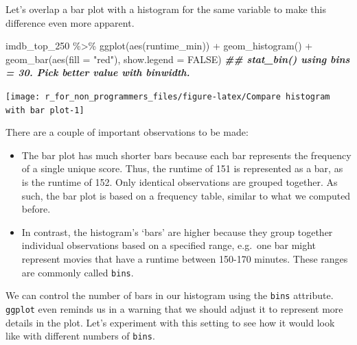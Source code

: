 \documentclass[
]{book}
\newenvironment{Shaded}{\begin{snugshade}}{\end{snugshade}}
\newcommand{\AttributeTok}[1]{\textcolor[rgb]{0.77,0.63,0.00}{#1}}
\newcommand{\ConstantTok}[1]{\textcolor[rgb]{0.00,0.00,0.00}{#1}}
\newcommand{\DocumentationTok}[1]{\textcolor[rgb]{0.56,0.35,0.01}{\textbf{\textit{#1}}}}
\newcommand{\FunctionTok}[1]{\textcolor[rgb]{0.00,0.00,0.00}{#1}}
\newcommand{\NormalTok}[1]{#1}
\newcommand{\SpecialCharTok}[1]{\textcolor[rgb]{0.00,0.00,0.00}{#1}}
\newcommand{\StringTok}[1]{\textcolor[rgb]{0.31,0.60,0.02}{#1}}
\begin{document}
Let's overlap a bar plot with a histogram for the same variable to make this difference even more apparent.

\begin{Shaded}
\begin{Highlighting}[]
\NormalTok{imdb\_top\_250 }\SpecialCharTok{\%\textgreater{}\%}
  \FunctionTok{ggplot}\NormalTok{(}\FunctionTok{aes}\NormalTok{(runtime\_min)) }\SpecialCharTok{+}
  \FunctionTok{geom\_histogram}\NormalTok{() }\SpecialCharTok{+}
  \FunctionTok{geom\_bar}\NormalTok{(}\FunctionTok{aes}\NormalTok{(}\AttributeTok{fill =} \StringTok{"red"}\NormalTok{), }\AttributeTok{show.legend =} \ConstantTok{FALSE}\NormalTok{)}
\DocumentationTok{\#\# \textasciigrave{}stat\_bin()\textasciigrave{} using \textasciigrave{}bins = 30\textasciigrave{}. Pick better value with \textasciigrave{}binwidth\textasciigrave{}.}
\end{Highlighting}
\end{Shaded}

\begin{center}\texttt{[image: r\_for\_non\_programmers\_files/figure-latex/Compare histogram with bar plot-1]} \end{center}

There are a couple of important observations to be made:

\begin{itemize}
\item
  The bar plot has much shorter bars because each bar represents the frequency of a single unique score. Thus, the runtime of 151 is represented as a bar, as is the runtime of 152. Only identical observations are grouped together. As such, the bar plot is based on a frequency table, similar to what we computed before.
\item
  In contrast, the histogram's `bars' are higher because they group together individual observations based on a specified range, e.g.~one bar might represent movies that have a runtime between 150-170 minutes. These ranges are commonly called \texttt{bins}.
\end{itemize}

We can control the number of bars in our histogram using the \texttt{bins} attribute. \texttt{ggplot} even reminds us in a warning that we should adjust it to represent more details in the plot. Let's experiment with this setting to see how it would look like with different numbers of \texttt{bins}.
\end{document}

